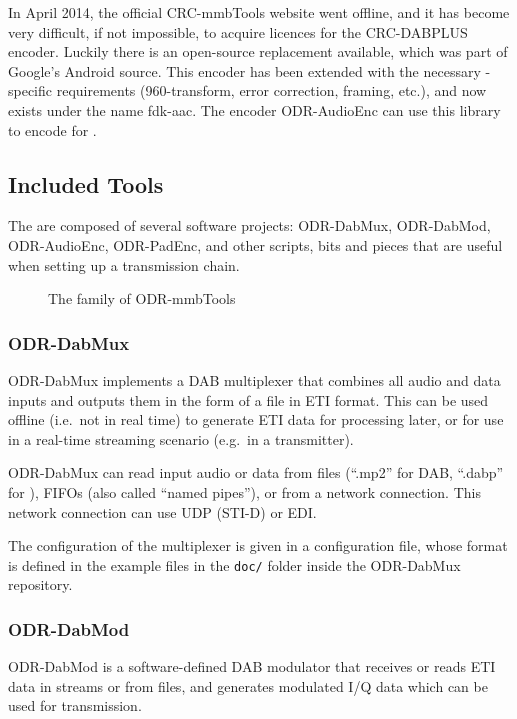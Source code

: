 In April 2014, the official \mbox{CRC-mmbTools} website went offline, and it has
become very difficult, if not impossible, to acquire licences for the
\mbox{CRC-DABPLUS} encoder. Luckily there is an open-source replacement
available, which was part of Google's Android source. This encoder has been
extended with the necessary \dabplus{}-specific requirements (960-transform,
error correction, framing, etc.), and now exists under the name
\mbox{fdk-aac}. The encoder \mbox{ODR-AudioEnc} can use this library to encode for
\dabplus{}.

\subsection{Included Tools}
The \mmbtools are composed of several software projects:
\mbox{ODR-DabMux}, \mbox{ODR-DabMod},
\mbox{ODR-AudioEnc}, \mbox{ODR-PadEnc}, and other scripts, bits and pieces
that are useful when setting up a transmission chain.

\begin{figure}[h]
    \centering
    \caption{The family of ODR-mmbTools}
    \label{fig:family_mmbTools}
\end{figure}

\subsubsection{ODR-DabMux}
ODR-DabMux implements a DAB multiplexer that combines all audio and data inputs
and outputs them in the form of a file in ETI format. This can be used offline
(i.e.~not in real time) to generate ETI data for processing later, or for use in
a real-time streaming scenario (e.g.~in a transmitter).

ODR-DabMux can read input audio or data from files (``.mp2'' for DAB, ``.dabp'' for
\dabplus), FIFOs (also called ``named pipes''), or from a network connection. This
network connection can use UDP (STI-D) or EDI.

The configuration of the multiplexer is given in a configuration file, whose
format is defined in the example files in the \verb+doc/+ folder inside the
ODR-DabMux repository.


\subsubsection{ODR-DabMod}
ODR-DabMod is a software-defined DAB modulator that receives or reads ETI data
in streams or from files, and generates modulated I/Q data which can be used for
transmission.

